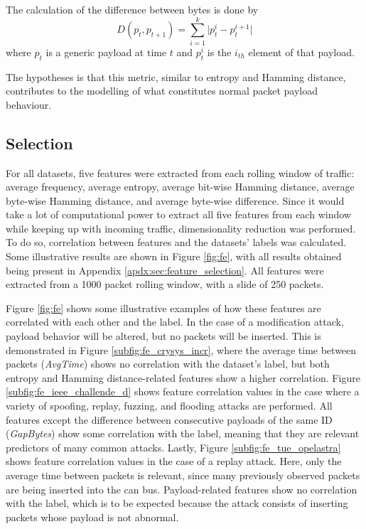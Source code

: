 The calculation of the difference between bytes is done by \[D(p_t, p_{t+1}) = \sum_{i = 1}^{k} \vert p_t^i - p_t^{i+1} \vert \] where $p_t$ is a generic payload at time $t$ and $p_t^i$ is the $i_{th}$ element of that payload.\par
The hypotheses is that this metric, similar to entropy and Hamming distance, contributes to the modelling of what constitutes normal packet payload behaviour.

\subsection{Selection}

For all datasets, five features were extracted from each rolling window of traffic: average frequency, average entropy, average bit-wise Hamming distance, average byte-wise Hamming distance, and average byte-wise difference. Since it would take a lot of computational power to extract all five features from each window while keeping up with incoming traffic, dimensionality reduction was performed. To do so, correlation between features and the datasets' labels was calculated. Some illustrative results are shown in Figure \ref{fig:fe}, with all results obtained being present in Appendix \ref{apdx:sec:feature_selection}. All features were extracted from a 1000 packet rolling window, with a slide of 250 packets.\par

Figure \ref{fig:fe} shows some illustrative examples of how these features are correlated with each other and the label. In the case of a modification attack, payload behavior will be altered, but no packets will be inserted. This is demonstrated in Figure \ref{subfig:fe_crysys_incr}, where the average time between packets (\emph{AvgTime}) shows no correlation with the dataset's label, but both entropy and Hamming distance-related features show a higher correlation. Figure \ref{subfig:fe_ieee_challende_d} shows feature correlation values in the case where a variety of spoofing, replay, fuzzing, and flooding attacks are performed. All features except the difference between consecutive payloads of the same ID (\emph{GapBytes}) show some correlation with the label, meaning that they are relevant predictors of many common attacks. Lastly, Figure \ref{subfig:fe_tue_opelastra} shows feature correlation values in the case of a replay attack. Here, only the average time between packets is relevant, since many previously observed packets are being inserted into the \gls*{can} bus. Payload-related features show no correlation with the label, which is to be expected because the attack consists of inserting packets whose payload is not abnormal.

